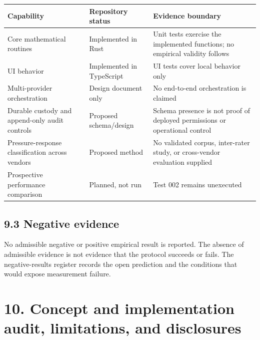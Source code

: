 \documentclass[
  english,
]{article}
\newcounter{none} %
\begin{document}
{\def\LTcaptype{none} %
\begin{longtable}[]{@{}
  >{\raggedright\arraybackslash}p{}
  >{\raggedright\arraybackslash}p{}
  >{\raggedright\arraybackslash}p{}@{}}
\toprule\noalign{}
\begin{minipage}[b]{\linewidth}\raggedright
Capability
\end{minipage} & \begin{minipage}[b]{\linewidth}\raggedright
Repository status
\end{minipage} & \begin{minipage}[b]{\linewidth}\raggedright
Evidence boundary
\end{minipage} \\
\midrule\noalign{}
\endhead
\bottomrule\noalign{}
\endlastfoot
Core mathematical routines & Implemented in Rust & Unit tests exercise
the implemented functions; no empirical validity follows \\
UI behavior & Implemented in TypeScript & UI tests cover local behavior
only \\
Multi-provider orchestration & Design document only & No end-to-end
orchestration is claimed \\
Durable custody and append-only audit controls & Proposed schema/design
& Schema presence is not proof of deployed permissions or operational
control \\
Pressure-response classification across vendors & Proposed method & No
validated corpus, inter-rater study, or cross-vendor evaluation
supplied \\
Prospective performance comparison & Planned, not run & Test 002 remains
unexecuted \\
\end{longtable}
}

\subsection{9.3 Negative evidence}\label{negative-evidence}

No admissible negative or positive empirical result is reported. The
absence of admissible evidence is not evidence that the protocol
succeeds or fails. The negative-results register records the open
prediction and the conditions that would expose measurement failure.

\section{10. Concept and implementation audit, limitations, and
disclosures}\label{concept-and-implementation-audit-limitations-and-disclosures}
\end{document}
